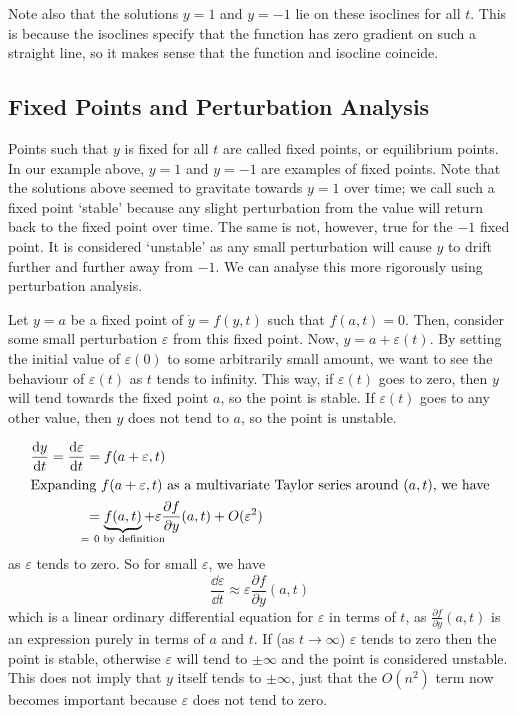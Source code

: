 Note also that the solutions \(y = 1\) and \(y = -1\) lie on these isoclines for all \(t\).
This is because the isoclines specify that the function has zero gradient on such a straight line, so it makes sense that the function and isocline coincide.

\subsection{Fixed Points and Perturbation Analysis}
Points such that \(y\) is fixed for all \(t\) are called fixed points, or equilibrium points.
In our example above, \(y=1\) and \(y=-1\) are examples of fixed points.
Note that the solutions above seemed to gravitate towards \(y=1\) over time; we call such a fixed point `stable' because any slight perturbation from the value will return back to the fixed point over time.
The same is not, however, true for the \(-1\) fixed point.
It is considered `unstable' as any small perturbation will cause \(y\) to drift further and further away from \(-1\).
We can analyse this more rigorously using perturbation analysis.

Let \(y = a\) be a fixed point of \(\dot y = f(y, t)\) such that \(f(a, t) = 0\).
Then, consider some small perturbation \(\varepsilon\) from this fixed point.
Now, \(y = a + \varepsilon(t)\).
By setting the initial value of \(\varepsilon(0)\) to some arbitrarily small amount, we want to see the behaviour of \(\varepsilon(t)\) as \(t\) tends to infinity.
This way, if \(\varepsilon(t)\) goes to zero, then \(y\) will tend towards the fixed point \(a\), so the point is stable.
If \(\varepsilon(t)\) goes to any other value, then \(y\) does not tend to \(a\), so the point is unstable.

\begin{align*}
	\frac{\dd{y}}{\dd{t}} = \frac{\dd \varepsilon}{\dd{t}} & = f(a + \varepsilon, t)                                                                                                            \\
	\intertext{Expanding \(f(a + \varepsilon, t)\) as a multivariate Taylor series around \((a, t)\), we have}
	                                                       & = \underbrace{f(a, t)}_{\mathclap{=\ 0\text{ by definition}}} + \varepsilon \frac{\partial f}{\partial y}(a, t) + O(\varepsilon^2)
\end{align*}
as \(\varepsilon\) tends to zero.
So for small \(\varepsilon\), we have
\[
	\frac{\dd \varepsilon}{\dd{t}} \approx \varepsilon \frac{\partial f}{\partial y}(a, t)
\]
which is a linear ordinary differential equation for \(\varepsilon\) in terms of \(t\), as \(\frac{\partial f}{\partial y}(a, t)\) is an expression purely in terms of \(a\) and \(t\).
If (as \(t \to \infty\)) \(\varepsilon\) tends to zero then the point is stable, otherwise \(\varepsilon\) will tend to \(\pm \infty\) and the point is considered unstable.
This does not imply that \(y\) itself tends to \(\pm \infty\), just that the \(O(n^2)\) term now becomes important because \(\varepsilon\) does not tend to zero.

